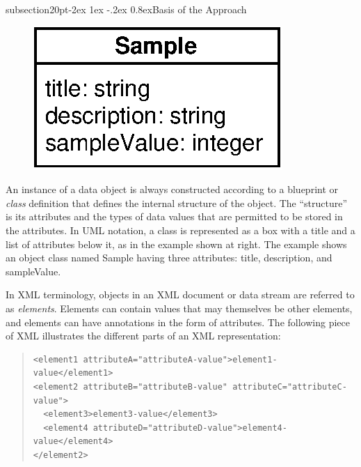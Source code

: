 \documentclass[10pt]{article}
\makeatletter
\renewcommand{\subsection}{\@startsection%
  {subsection}{2}{0pt}{-2ex \@plus 1ex \@minus -.2ex}%
  {0.8ex}{\slshape\large\bfseries}}
\newcommand{\tightspacing}{\renewcommand{\baselinestretch}{0.85}}
\newcommand{\regularspacing}{\renewcommand{\baselinestretch}{1.0}}
\newcommand{\class}[1]{\textsf{#1}}
\newcommand{\attrib}[1]{\textsf{#1}}
\makeatother
\begin{document}
\subsection{Basis of the Approach}
\label{sec:xml}

\begin{figure}
  \begin{center}
    \includegraphics[scale = 0.7]{sampleschema.eps}
  \end{center}
\end{figure}
An instance of a data object is always constructed according to a blueprint
or \emph{class} definition that defines the internal structure of the
object.  The ``structure'' is its attributes and the types of data values
that are permitted to be stored in the attributes.  In UML notation, a
class is represented as a box with a title and a list of attributes below
it, as in the example shown at right.  The example shows an object class
named \class{Sample} having three attributes: \attrib{title},
\attrib{description}, and \attrib{sampleValue}.

In XML terminology, objects in an XML document or data stream are referred
to as \emph{elements}.  Elements can contain values that may themselves be
other elements, and elements can have annotations in the form of
attributes.  The following piece of XML illustrates the different parts of
an XML representation:

\begin{quote}
  \begin{small}
    \tightspacing
\begin{verbatim}
<element1 attributeA="attributeA-value">element1-value</element1>
<element2 attributeB="attributeB-value" attributeC="attributeC-value">
  <element3>element3-value</element3>
  <element4 attributeD="attributeD-value">element4-value</element4>
</element2>
\end{verbatim}
    \regularspacing
  \end{small}
\end{quote}
\end{document}
